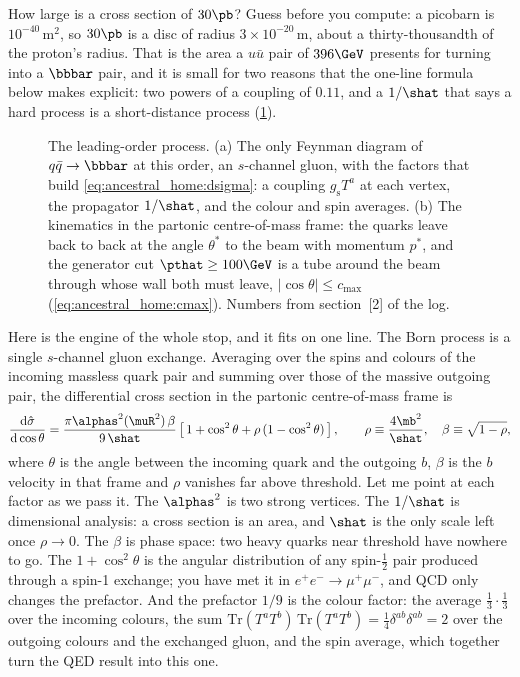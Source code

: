 How large is a cross section of $30\pb$? Guess before you compute: a
picobarn is $10^{-40}\,\mathrm{m}^2$, so $30\pb$ is a disc of radius
$3\times10^{-20}\,\mathrm{m}$, about a thirty-thousandth of the proton's radius. That is the
area a $u\bar u$ pair of $396\GeV$ presents for turning into a $\bbbar$ pair,
and it is small for two reasons that the one-line formula below makes
explicit: two powers of a coupling of $0.11$, and a $1/\shat$ that says a
hard process is a short-distance process
(\cref{fig:ancestral_home:feynman_qqbar}).

\begin{figure}[htbp]\centering
\resizebox{\textwidth}{!}{}
\caption[The leading-order diagram and the kinematics of the partonic frame]{The leading-order process. (a) The only Feynman diagram of $q\bar q\to\bbbar$ at this order, an $s$-channel gluon, with the factors that build \cref{eq:ancestral_home:dsigma}: a coupling $g_{\mathrm s}T^a$ at each vertex, the propagator $1/\shat$, and the colour and spin averages. (b) The kinematics in the partonic centre-of-mass frame: the quarks leave back to back at the angle $\theta^*$ to the beam with momentum $p^*$, and the generator cut $\pthat\ge100\GeV$ is a tube around the beam through whose wall both must leave, $|\cos\theta|\le c_{\max}$ (\cref{eq:ancestral_home:cmax}). Numbers from section~[2] of the  log.}
\label{fig:ancestral_home:feynman_qqbar}
\end{figure}

Here is the engine of the whole stop, and it fits on one line. The Born
process is a single $s$-channel gluon exchange. Averaging over the spins and
colours of the incoming massless quark pair and summing over those of the
massive outgoing pair, the differential cross section in the partonic
centre-of-mass frame is~\cite{ParticleDataGroup:2024cfk}
\begin{equation}
  \frac{\mathrm{d}\hat\sigma}{\mathrm{d}\cos\theta}
  = \frac{\pi\alphas^2(\muR^2)\,\beta}{9\,\shat}
    \left[\,1+\cos^2\theta+\rho\,(1-\cos^2\theta)\,\right],
  \qquad
  \rho\equiv\frac{4\mb^2}{\shat},\quad \beta\equiv\sqrt{1-\rho},
  \label{eq:ancestral_home:dsigma}
\end{equation}
where $\theta$ is the angle between the incoming quark and the outgoing $b$,
$\beta$ is the $b$ velocity in that frame and $\rho$ vanishes far above
threshold. Let me point at each factor as we pass it. The $\alphas^2$ is two
strong vertices. The $1/\shat$ is dimensional analysis: a cross section is an
area, and $\shat$ is the only scale left once $\rho\to0$. The $\beta$ is
phase space: two heavy quarks near threshold have nowhere to go. The
$1+\cos^2\theta$ is the angular distribution of any spin-$\tfrac12$ pair
produced through a spin-1 exchange; you have met it in $e^+e^-\to\mu^+\mu^-$,
and QCD only changes the prefactor. And the prefactor $1/9$ is the colour
factor: the average $\tfrac13\cdot\tfrac13$ over the incoming colours, the
sum $\mathrm{Tr}(T^aT^b)\,\mathrm{Tr}(T^aT^b)=\tfrac14\delta^{ab}\delta^{ab}=2$
over the outgoing colours and the exchanged gluon, and the spin average, which
together turn the QED result into this one.

